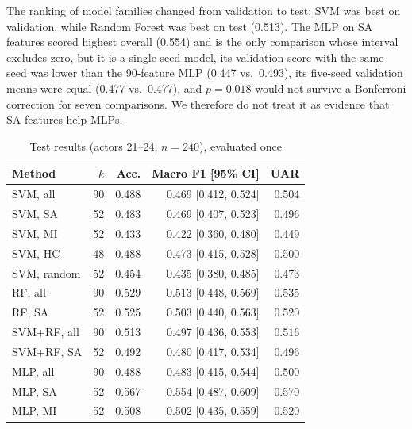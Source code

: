 \documentclass[conference]{IEEEtran}
\begin{document}
The ranking of model families changed from validation to test: SVM was best on validation, while
Random Forest was best on test (0.513). The MLP on SA features scored highest overall (0.554) and
is the only comparison whose interval excludes zero, but it is a single-seed model, its validation
score with the same seed was lower than the 90-feature MLP (0.447 vs.\ 0.493), its five-seed
validation means were equal (0.477 vs.\ 0.477), and $p=0.018$ would not survive a Bonferroni
correction for seven comparisons. We therefore do not treat it as evidence that SA features help
MLPs.

\begin{table}[t]
\caption{Test results (actors 21--24, $n=240$), evaluated once}
\label{tab:test}
\centering
\small
\setlength{\tabcolsep}{3.5pt}
\begin{tabular}{@{}lrrrr@{}}
\toprule
Method & $k$ & Acc. & Macro F1 [95\% CI] & UAR \\
\midrule
SVM, all & 90 & 0.488 & 0.469 [0.412, 0.524] & 0.504 \\
SVM, SA & 52 & 0.483 & 0.469 [0.407, 0.523] & 0.496 \\
SVM, MI & 52 & 0.433 & 0.422 [0.360, 0.480] & 0.449 \\
SVM, HC & 48 & 0.488 & 0.473 [0.415, 0.528] & 0.500 \\
SVM, random & 52 & 0.454 & 0.435 [0.380, 0.485] & 0.473 \\
RF, all & 90 & 0.529 & 0.513 [0.448, 0.569] & 0.535 \\
RF, SA & 52 & 0.525 & 0.503 [0.440, 0.563] & 0.520 \\
SVM+RF, all & 90 & 0.513 & 0.497 [0.436, 0.553] & 0.516 \\
SVM+RF, SA & 52 & 0.492 & 0.480 [0.417, 0.534] & 0.496 \\
MLP, all & 90 & 0.488 & 0.483 [0.415, 0.544] & 0.500 \\
MLP, SA & 52 & 0.567 & 0.554 [0.487, 0.609] & 0.570 \\
MLP, MI & 52 & 0.508 & 0.502 [0.435, 0.559] & 0.520 \\
\bottomrule
\end{tabular}
\end{table}
\end{document}
